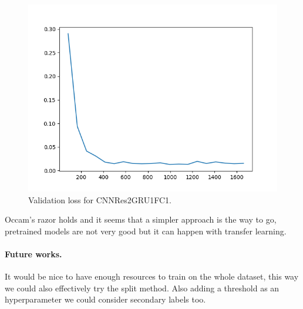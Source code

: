 \documentclass{article}
\begin{document}
\begin{figure}
    \centering
    \includegraphics[scale=.5]{images/val_loss.png}
    \caption{Validation loss for CNNRes2GRU1FC1.}
    \label{fig:val-loss}
\end{figure}

Occam's razor holds and it seems that a simpler approach is the way to go, pretrained models are not very good but it can happen with transfer learning. 

\paragraph*{Future works.}
It would be nice to have enough resources to train on the whole dataset, this way we could also effectively try the split method.
Also adding a threshold as an hyperparameter we could consider secondary labels too.



\end{document}
